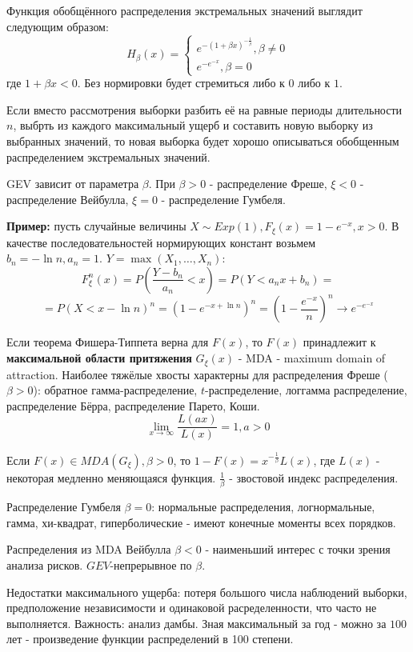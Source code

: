 \documentclass[%
12pt, %
final, %
oneside, %
onecolumn, %
centertags]{article} %
\theoremstyle{plain}
\theoremstyle{definition}
\theoremstyle{remark}
\begin{document}
Функция обобщённого распределения экстремальных значений выглядит следующим образом:
$$H_{\beta}(x) = \begin{cases}
	e^{-(1+\beta x)^{-\frac{1}{\beta}}}, \beta \neq 0 \\
	e^{-e^{-x}}, \beta = 0
\end{cases}$$
где $1 + \beta x < 0$. Без нормировки будет стремиться либо к $0$ либо к $1$.

Если вместо рассмотрения выборки разбить её на равные периоды длительности $n$, выбрть из каждого максимальный ущерб и составить новую выборку из выбранных значений, то новая выборка будет хорошо описываться обобщенным распределением экстремальных значений.

GEV зависит от параметра $\beta$. При $\beta > 0$ - распределение Фреше, $\xi < 0$ - распределение Вейбулла, $\xi =0$ - распределение Гумбеля.

\textbf{Пример:} пусть случайные величины $X \sim Exp(1), F_{\xi}(x) = 1 - e^{-x}, x>0$. В качестве последовательностей нормирующих констант возьмем $b_n = -\ln n, a_n = 1$. $Y = \max(X_1, \ldots, X_n)$:
$$F_{\xi}^n(x) = P\left(\frac{Y-b_n}{a_n} < x\right) = P(Y < a_nx + b_n) = $$
$$ = P(X < x - \ln n)^n = (1 - e^{-x+\ln n})^n = \left(1 - \frac{e^{-x}}{n}\right)^n \to e^{-e^{-x}}$$

Если теорема Фишера-Типпета верна для $F(x)$, то $F(x)$ принадлежит к \textbf{максимальной области притяжения} $G_{\xi}(x)$ - MDA - maximum domain of attraction. Наиболее тяжёлые хвосты характерны для распределения Фреше ($\beta > 0$): обратное гамма-распределение, $t$-распределение, логгамма распределение, распределение Бёрра, распределение Парето, Коши.
$$\lim\limits_{x \to \infty} \frac{L(ax)}{L(x)} = 1, a>0$$

Если $F(x) \in MDA(G_{\xi}), \beta >0$, то $1 - F(x) = x^{-\frac{1}{\beta}}L(x)$, где $L(x)$ - некоторая медленно меняющаяся функция. $\frac{1}{\beta}$ - звостовой индекс распределения.

Распределение Гумбеля $\beta=0$: нормальные распределения, логнормальные, гамма, хи-квадрат, гиперболические - имеют конечные моменты всех порядков.

Распределения из MDA Вейбулла $\beta <0$ - наименьший интерес с точки зрения анализа рисков. $GEV$-непрерывное по $\beta$. 

Недостатки максимального ущерба: потеря большого числа наблюдений выборки, предположение независимости и одинаковой расределенности, что часто не выполняется. Важность: анализ дамбы. Зная максимальный за год - можно за $100$ лет - произведение функции распределений в 100 степени.
\end{document}
